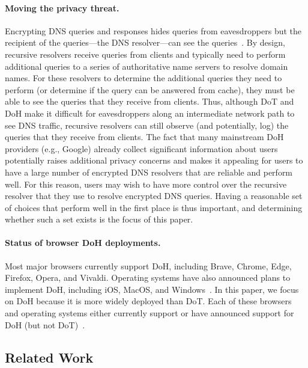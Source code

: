\paragraph{Moving the privacy threat.} Encrypting DNS queries and responses hides queries
from eavesdroppers but the recipient of the queries---the DNS resolver---can
see the queries~\cite{IEEEfight}. By design, recursive resolvers receive
queries from clients and typically need to perform additional queries to a
series of authoritative name servers to resolve domain names.  For these
resolvers to determine the additional queries they need to perform (or
determine if the query can be answered from cache), they must be able to see
the queries that they receive from clients.  Thus, although DoT and DoH make
it difficult for eavesdroppers along an intermediate network path to see DNS
traffic, recursive resolvers can still observe (and potentially, log) the
queries that they receive from clients.  The fact that many mainstream DoH
providers (e.g., Google) already collect significant information about users
potentially raises additional privacy concerns and makes it appealing for
users to have a large number of encrypted DNS resolvers that are reliable and
perform well. For this reason, users may wish to have more control over the
recursive resolver that they use to resolve encrypted DNS queries. Having
a reasonable set of choices that perform well in the first place is thus
important, and determining whether such a set exists is the focus of this
paper.

\paragraph{Status of browser DoH deployments.}
Most major browsers currently support DoH, including Brave, Chrome, Edge,
Firefox, Opera, and Vivaldi.  Operating systems have also announced
plans to implement DoH, including iOS, MacOS, and
Windows~\cite{ffSettings,operaEdgeSettings,vivaldiSettings,iosSettings,jensen2020windows}.
In this paper, we focus on DoH because it is more widely deployed
than DoT.  Each of these browsers and operating systems either
currently support or have announced support for DoH (but not
DoT)~\cite{lack-of-dot-support}.

\subsection{Related Work}

